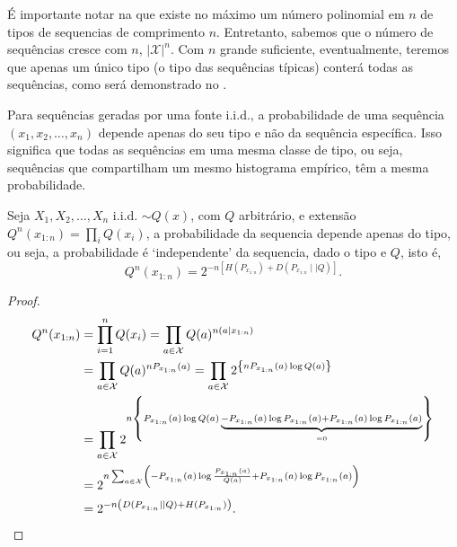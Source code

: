 É importante notar na  que existe no máximo um número polinomial em
$n$ de tipos de sequencias de comprimento $n$. Entretanto, sabemos que o número de sequências cresce com $n$,
$\vert \mathcal{X} \vert^n$. Com $n$ grande suficiente, eventualmente, teremos que apenas um único tipo
(o tipo das sequências típicas) conterá todas as sequências, como será demonstrado no .


Para sequências geradas por uma fonte i.i.d., a probabilidade de uma sequência
$(x_1, x_2, \ldots, x_n)$ depende apenas do seu tipo e não da sequência específica.
Isso significa que todas as sequências em uma mesma classe de tipo, ou seja,
sequências que compartilham um mesmo histograma empírico, têm a mesma probabilidade.

\begin{theorem}\label{thm:probabilidadetipo}
Seja $X_1, X_2, \ldots, X_n$ i.i.d. $\sim Q(x)$, com $Q$ arbitrário, e extensão
$Q^n(x_{1:n}) = \prod_i Q(x_i)$, a probabilidade da sequencia depende apenas do tipo, ou seja,
a probabilidade é `independente' da sequencia, dado o tipo e $Q$, isto é,
\begin{equation}
Q^n(x_{1:n}) = 2^{-n[ H(P_{x_{1:n}}) + D(P_{x_{1:n}} \mid\mid Q) ]} .
\end{equation}
\end{theorem}

\begin{proof}
\begin{subequations}
\begin{align}
  Q^n(x_{1:n}) &= \prod_{i=1}^{n} Q(x_i) = \prod_{a \in \mathcal{X}} Q(a)^{n(a \mid x_{1:n})} \\
        &= \prod_{a \in \mathcal{X}} Q(a)^{n P_{x_{1:n}}(a) } = \prod_{a \in \mathcal{X}} 2^{ \left\{ n P_{x_{1:n}}(a) \log Q(a) \right\} } \\
        &= \prod_{a \in \mathcal{X}} 2^{ n \left\{  P_{x_{1:n}}(a) \log Q(a) \KeepStyleUnderBrace{ -P_{x_{1:n}}(a) \log P_{x_{1:n}}(a) + P_{x_{1:n}}(a) \log P_{x_{1:n}}(a) }_{=0} \right\} } \\
        &= 2^{n \sum_{a \in \mathcal{X}}  \left( -P_{x_{1:n}}(a) \log \frac{P_{x_{1:n}}(a)}{Q(a)} + P_{x_{1:n}}(a) \log P_{x_{1:n}}(a) \right)  } \\
        &= 2^{-n \left( D(P_{x_{1:n}} \mid \mid Q) + H( P_{x_{1:n}} ) \right) } .
\end{align}
\end{subequations}
\end{proof}

